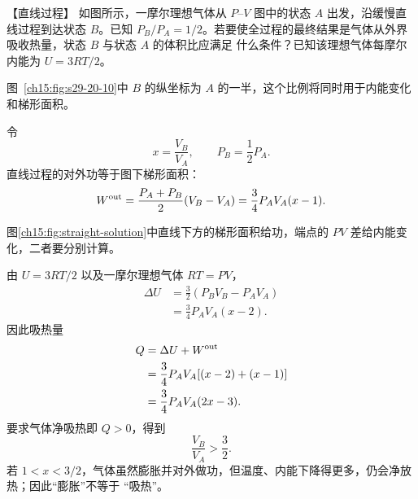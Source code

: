 {\begin{origexamplebox}{【直线过程】}\label{ch15:ex:s29-20-10}
如图所示，一摩尔理想气体从 $P$--$V$ 图中的状态 $A$ 出发，沿缓慢直线过程到达状态 $B$。已知
$P_B/P_A=1/2$。若要使全过程的最终结果是气体从外界吸收热量，状态 $B$ 与状态 $A$ 的体积比应满足
什么条件？已知该理想气体每摩尔内能为 $U=3RT/2$。
\par\noindent\begin{minipage}{\linewidth}
\straightQuestionRedraw
{}\label{ch15:fig:s29-20-10}
\end{minipage}\par\medskip
图~\ref{ch15:fig:s29-20-10}中 $B$ 的纵坐标为 $A$ 的一半，这个比例将同时用于内能变化和梯形面积。
\end{origexamplebox}\par\nopagebreak[4]

\par\nopagebreak[4]\begin{xesolution}
令
\begin{equation*}
  x=\frac{V_B}{V_A},
  \qquad P_B=\frac12P_A.
\end{equation*}
直线过程的对外功等于图下梯形面积：
\begin{equation*}
  W^{\rm out}
  =\frac{P_A+P_B}{2}(V_B-V_A)
  =\frac34P_AV_A(x-1).
\end{equation*}

\par\noindent\begin{minipage}{\linewidth}
\straightProcessDiagram
{}\label{ch15:fig:straight-solution}
\end{minipage}\par\medskip
图\ref{ch15:fig:straight-solution}中直线下方的梯形面积给功，端点的 $PV$ 差给内能变化，二者要分别计算。

由 $U=3RT/2$ 以及一摩尔理想气体 $RT=PV$，
\begin{align*}
  \Delta U
  &=\frac32(P_BV_B-P_AV_A)\\
  &=\frac34P_AV_A(x-2).
\end{align*}
因此吸热量
\begin{align*}
  Q&=\Delta U+W^{\rm out}\\
   &=\frac34P_AV_A[(x-2)+(x-1)]\\
   &=\frac34P_AV_A(2x-3).
\end{align*}
要求气体净吸热即 $Q>0$，得到
\begin{equation}
  \boxed{\frac{V_B}{V_A}>\frac32}.
\end{equation}
若 $1<x<3/2$，气体虽然膨胀并对外做功，但温度、内能下降得更多，仍会净放热；因此“膨胀”不等于
“吸热”。
\end{xesolution}


}
